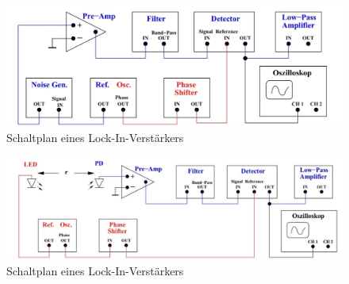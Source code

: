 \begin{figure}
  \centering
  \includegraphics[width=\textwidth]{data/Schaltung3.jpg}
  \caption{Schaltplan eines Lock-In-Verstärkers \cite{V303}}
  \label{fig:Schaltung3}
\end{figure}

\begin{figure}
  \centering
  \includegraphics[width=\textwidth]{data/Schaltung4.jpg}
  \caption{Schaltplan eines Lock-In-Verstärkers \cite{V303}}
  \label{fig:Schaltung4}
\end{figure}
